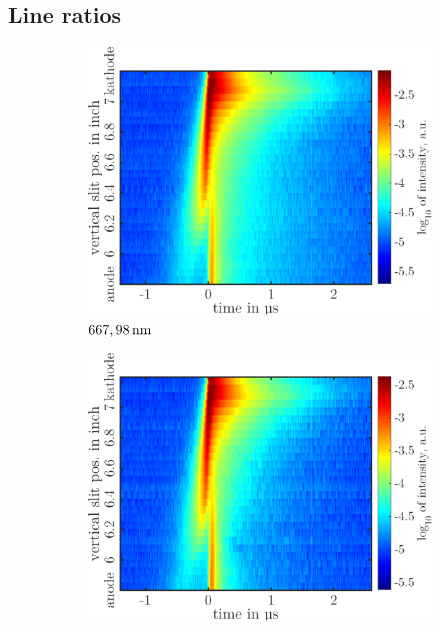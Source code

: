 \documentclass[a4paper,10pt,twoside]{article}
\begin{document}
		\subsection{Line ratios}
		
			\onecolumn
			
			\begin{figure}
				\centering
				\begin{subfigure}[t]{0.49\textwidth}
					\includegraphics[width=\textwidth]{figures/lineratio/korr667nm}
					\caption{$\unit[667,98]{nm}$}
					\label{img:667nm}
				\end{subfigure}
				\hfill
				\begin{subfigure}[t]{0.49\textwidth}
					\includegraphics[width=\textwidth]{figures/lineratio/korr728nm}

\end{subfigure}
\end{figure}
\end{document}
